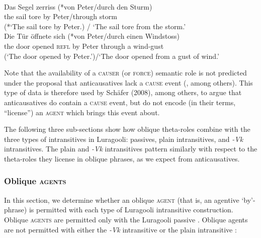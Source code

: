 \documentclass[output=paper]{langsci/langscibook}
\begin{document}
\ex\label{ex:}
\\
\gll   Das Segel zerriss (*von Peter/durch den Sturm)\\
       the  sail    tore        by    Peter/through storm\\
\glt (*‘The sail tore by Peter.) / ‘The sail tore from the storm.’
\ex\label{ex:}
\\
\gll   Die Tür   öffnete sich (*von Peter/durch einen Windstoss)\\
       the door opened \textsc{refl}  by   Peter  through a wind-gust\\
\glt (‘The door opened by Peter.’)/‘The door opened from a gust of wind.’
\z
\z

Note that the availability of a \textsc{causer} (or \textsc{force}) semantic role is not predicted under the proposal that anticausatives lack a\textsc{ cause }event (\citealt{Haspelmath1993}, among others). This type of data is therefore used by Schäfer (2008), among others, to argue that anticausatives do contain a \textsc{cause} event, but do not encode (in their terms, “license”) an \textsc{agent} which brings this event about. 

The following three sub-sections show how oblique theta-roles combine with the three types of intransitives in Luragooli: passives, plain intransitives, and \textit{-Vk} intransitives. The plain and \textit{-Vk} intransitives pattern similarly with respect to the theta-roles they license in oblique phrases, as we expect from anticausatives.

\subsubsection{Oblique \textsc{agents} }

In this section, we determine whether an oblique \textsc{agent} (that is, an agentive ‘by’-phrase) is permitted with each type of Luragooli intransitive construction. Oblique \textsc{agents} are permitted only with the Luragooli passive . Oblique agents are not permitted with either the \textit{-Vk} intransitive  or the plain intransitive :
\end{document}
